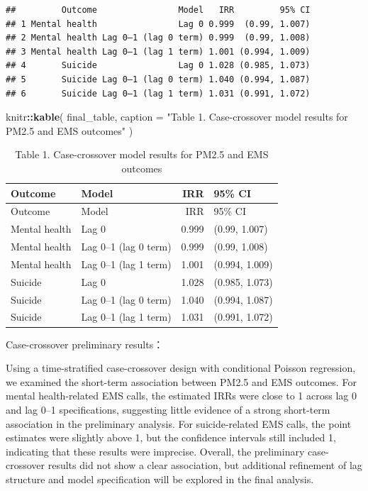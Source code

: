 \documentclass[
]{article}
\newenvironment{Shaded}{\begin{snugshade}}{\end{snugshade}}
\newcommand{\AttributeTok}[1]{\textcolor[rgb]{0.13,0.29,0.53}{#1}}
\newcommand{\FunctionTok}[1]{\textcolor[rgb]{0.13,0.29,0.53}{\textbf{#1}}}
\newcommand{\NormalTok}[1]{#1}
\newcommand{\SpecialCharTok}[1]{\textcolor[rgb]{0.81,0.36,0.00}{\textbf{#1}}}
\newcommand{\StringTok}[1]{\textcolor[rgb]{0.31,0.60,0.02}{#1}}
\begin{document}
\begin{verbatim}
##         Outcome                Model   IRR         95% CI
## 1 Mental health                Lag 0 0.999  (0.99, 1.007)
## 2 Mental health Lag 0–1 (lag 0 term) 0.999  (0.99, 1.008)
## 3 Mental health Lag 0–1 (lag 1 term) 1.001 (0.994, 1.009)
## 4       Suicide                Lag 0 1.028 (0.985, 1.073)
## 5       Suicide Lag 0–1 (lag 0 term) 1.040 (0.994, 1.087)
## 6       Suicide Lag 0–1 (lag 1 term) 1.031 (0.991, 1.072)
\end{verbatim}

\begin{Shaded}
\begin{Highlighting}[]
\NormalTok{knitr}\SpecialCharTok{::}\FunctionTok{kable}\NormalTok{(}
\NormalTok{  final\_table,}
  \AttributeTok{caption =} \StringTok{"Table 1. Case{-}crossover model results for PM2.5 and EMS outcomes"}
\NormalTok{)}
\end{Highlighting}
\end{Shaded}

\begin{longtable}[]{@{}llrl@{}}
\caption{Table 1. Case-crossover model results for PM2.5 and EMS
outcomes}\tabularnewline
\toprule\noalign{}
Outcome & Model & IRR & 95\% CI \\
\midrule\noalign{}
\endfirsthead
\toprule\noalign{}
Outcome & Model & IRR & 95\% CI \\
\midrule\noalign{}
\endhead
\bottomrule\noalign{}
\endlastfoot
Mental health & Lag 0 & 0.999 & (0.99, 1.007) \\
Mental health & Lag 0--1 (lag 0 term) & 0.999 & (0.99, 1.008) \\
Mental health & Lag 0--1 (lag 1 term) & 1.001 & (0.994, 1.009) \\
Suicide & Lag 0 & 1.028 & (0.985, 1.073) \\
Suicide & Lag 0--1 (lag 0 term) & 1.040 & (0.994, 1.087) \\
Suicide & Lag 0--1 (lag 1 term) & 1.031 & (0.991, 1.072) \\
\end{longtable}

Case-crossover preliminary results：

Using a time-stratified case-crossover design with conditional Poisson
regression, we examined the short-term association between PM2.5 and EMS
outcomes. For mental health-related EMS calls, the estimated IRRs were
close to 1 across lag 0 and lag 0--1 specifications, suggesting little
evidence of a strong short-term association in the preliminary analysis.
For suicide-related EMS calls, the point estimates were slightly above
1, but the confidence intervals still included 1, indicating that these
results were imprecise. Overall, the preliminary case-crossover results
did not show a clear association, but additional refinement of lag
structure and model specification will be explored in the final
analysis.
\end{document}
